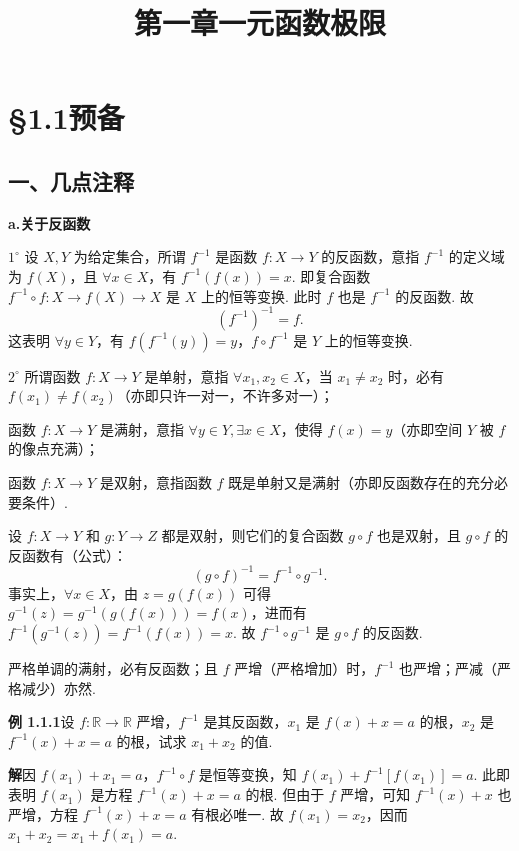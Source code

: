 \documentclass[UTF8, 12pt, fontset=fandol, oneside]{ctexart}
\title{第一章\quad 一元函数极限}
\author{}
\date{}
\begin{document}
\maketitle

\section*{§1.1\quad 预备}

\subsection*{一、几点注释}

\noindent\textbf{a.\quad 关于反函数}

$1^\circ$ 设 $X,Y$ 为给定集合，所谓 $f^{-1}$ 是函数 $f:X\to Y$ 的反函数，意指 $f^{-1}$ 的定义域为 $f(X)$，且 $\forall x\in X$，有 $f^{-1}(f(x))=x$. 即复合函数 $f^{-1}\circ f:X\to f(X)\to X$ 是 $X$ 上的恒等变换. 此时 $f$ 也是 $f^{-1}$ 的反函数. 故
\[
  (f^{-1})^{-1}=f.
\tag{A}
\]
这表明 $\forall y\in Y$，有 $f(f^{-1}(y))=y$，$f\circ f^{-1}$ 是 $Y$ 上的恒等变换.

$2^\circ$ 所谓函数 $f:X\to Y$ 是单射，意指 $\forall x_1,x_2\in X$，当 $x_1\ne x_2$ 时，必有 $f(x_1)\ne f(x_2)$（亦即只许一对一，不许多对一）；

函数 $f:X\to Y$ 是满射，意指 $\forall y\in Y,\exists x\in X$，使得 $f(x)=y$（亦即空间 $Y$ 被 $f$ 的像点充满）；

函数 $f:X\to Y$ 是双射，意指函数 $f$ 既是单射又是满射（亦即反函数存在的充分必要条件）.

设 $f:X\to Y$ 和 $g:Y\to Z$ 都是双射，则它们的复合函数 $g\circ f$ 也是双射，且 $g\circ f$ 的反函数有（公式）：
\[
  (g\circ f)^{-1}=f^{-1}\circ g^{-1}.
\tag{B}
\]
事实上，$\forall x\in X$，由 $z=g(f(x))$ 可得 $g^{-1}(z)=g^{-1}(g(f(x)))=f(x)$，进而有 $f^{-1}(g^{-1}(z))=f^{-1}(f(x))=x$. 故 $f^{-1}\circ g^{-1}$ 是 $g\circ f$ 的反函数.

严格单调的满射，必有反函数；且 $f$ 严增（严格增加）时，$f^{-1}$ 也严增；严减（严格减少）亦然.

\noindent\textbf{例 1.1.1}\quad 设 $f:\mathbb{R}\to\mathbb{R}$ 严增，$f^{-1}$ 是其反函数，$x_1$ 是 $f(x)+x=a$ 的根，$x_2$ 是 $f^{-1}(x)+x=a$ 的根，试求 $x_1+x_2$ 的值.

\noindent\textbf{解}\quad 因 $f(x_1)+x_1=a$，$f^{-1}\circ f$ 是恒等变换，知 $f(x_1)+f^{-1}[f(x_1)]=a$. 此即表明 $f(x_1)$ 是方程 $f^{-1}(x)+x=a$ 的根. 但由于 $f$ 严增，可知 $f^{-1}(x)+x$ 也严增，方程 $f^{-1}(x)+x=a$ 有根必唯一. 故 $f(x_1)=x_2$，因而 $x_1+x_2=x_1+f(x_1)=a$.
\end{document}

